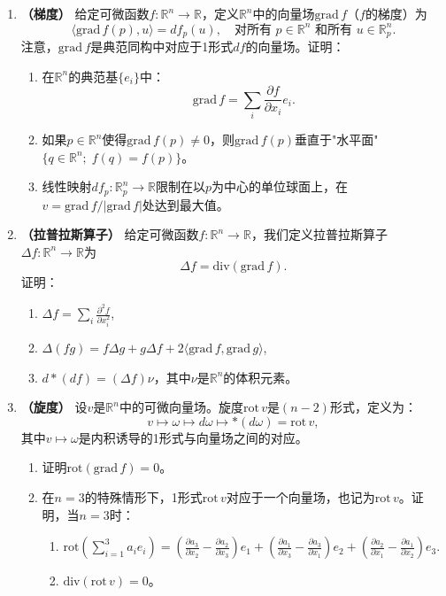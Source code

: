 \documentclass[12pt,a4paper]{ctexbook}
\begin{document}
\begin{enumerate}
    \item \textbf{（梯度）} 给定可微函数$f:\mathbb{R}^n\to\mathbb{R}$，定义$\mathbb{R}^n$中的向量场$\text{grad}\,f$（$f$的梯度）为
    $$\langle \text{grad}\,f(p), u\rangle = df_p(u),\quad \text{对所有 } p\in\mathbb{R}^n \text{ 和所有 } u\in\mathbb{R}_p^n.$$
    注意，$\text{grad}\,f$是典范同构中对应于1形式$df$的向量场。证明：
    \begin{enumerate}
        \item 在$\mathbb{R}^n$的典范基$\{e_i\}$中：
        $$\text{grad}\,f = \sum_i \frac{\partial f}{\partial x_i}e_i.$$
        \item 如果$p\in\mathbb{R}^n$使得$\text{grad}\,f(p)\neq 0$，则$\text{grad}\,f(p)$垂直于"水平面"$\{q\in\mathbb{R}^n;\; f(q)=f(p)\}$。
        \item 线性映射$df_p:\mathbb{R}_p^n\to\mathbb{R}$限制在以$p$为中心的单位球面上，在$v=\text{grad}\,f/|\text{grad}\,f|$处达到最大值。
    \end{enumerate}
    
    \item \textbf{（拉普拉斯算子）} 给定可微函数$f:\mathbb{R}^n\to\mathbb{R}$，我们定义拉普拉斯算子$\Delta f:\mathbb{R}^n\to\mathbb{R}$为
    $$\Delta f = \text{div}(\text{grad}\,f).$$
    证明：
    \begin{enumerate}
        \item $\Delta f = \sum_i \frac{\partial^2 f}{\partial x_i^2}$,
        \item $\Delta(fg) = f\Delta g + g\Delta f + 2\langle\text{grad}\,f,\text{grad}\,g\rangle$,
        \item $d*(df) = (\Delta f)\nu$，其中$\nu$是$\mathbb{R}^n$的体积元素。
    \end{enumerate}
    
    \item \textbf{（旋度）} 设$v$是$\mathbb{R}^n$中的可微向量场。旋度$\text{rot}\,v$是$(n-2)$形式，定义为：
    $$v \mapsto \omega \mapsto d\omega \mapsto *(d\omega) = \text{rot}\,v,$$
    其中$v\mapsto\omega$是内积诱导的1形式与向量场之间的对应。
    \begin{enumerate}
        \item 证明$\text{rot}(\text{grad}\,f)=0$。
        \item 在$n=3$的特殊情形下，1形式$\text{rot}\,v$对应于一个向量场，也记为$\text{rot}\,v$。证明，当$n=3$时：
        \begin{enumerate}
            \item $\text{rot}\left(\sum_{i=1}^3 a_i e_i\right) = \left(\frac{\partial a_3}{\partial x_2} - \frac{\partial a_2}{\partial x_3}\right)e_1 + \left(\frac{\partial a_1}{\partial x_3} - \frac{\partial a_3}{\partial x_1}\right)e_2 + \left(\frac{\partial a_2}{\partial x_1} - \frac{\partial a_1}{\partial x_2}\right)e_3$.
            \item $\text{div}(\text{rot}\,v) = 0$。
        \end{enumerate}
    \end{enumerate}
\end{enumerate}
\end{document}

